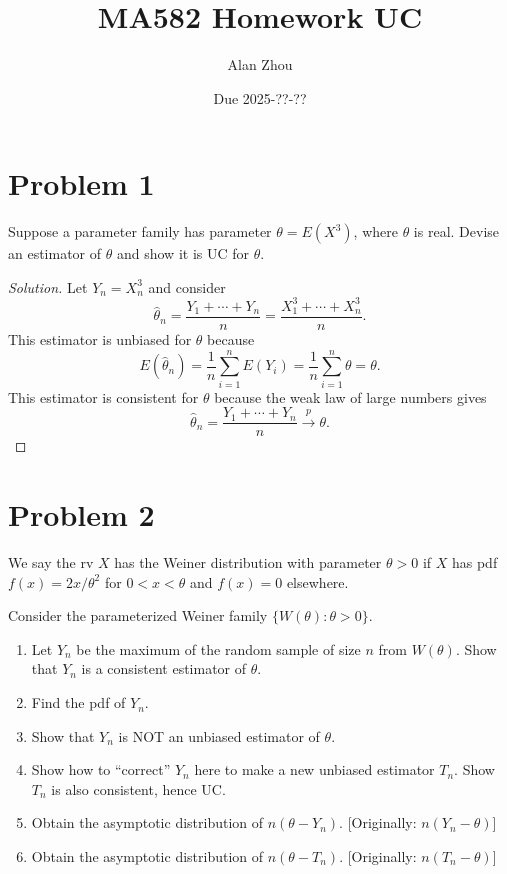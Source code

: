 \documentclass{article}
\title{MA582 Homework UC}
\author{Alan Zhou}
\date{Due 2025-??-??}
\begin{document}
\maketitle


\section{Problem 1}

Suppose a parameter family has parameter $\theta = E(X^3)$, where $\theta$ is real. Devise an estimator of $\theta$ and show it is UC for $\theta$.

\begin{proof}[Solution]
Let $Y_n = X_n^3$ and consider
\begin{equation*}
\hat{\theta}_n = \frac{Y_1 + \cdots + Y_n}{n} = \frac{X_1^3 + \cdots + X_n^3}{n}.
\end{equation*}
This estimator is unbiased for $\theta$ because
\begin{equation*}
E(\hat{\theta}_n) = \frac{1}{n}\sum_{i = 1}^n E(Y_i) = \frac{1}{n}\sum_{i = 1}^n \theta = \theta.
\end{equation*}
This estimator is consistent for $\theta$ because the weak law of large numbers gives
\begin{equation*}
\hat{\theta}_n = \frac{Y_1 + \cdots + Y_n}{n}\stackrel{p}{\longrightarrow}\theta.
\end{equation*}
\end{proof}



\section{Problem 2}

We say the rv $X$ has the Weiner distribution with parameter $\theta > 0$ if $X$ has pdf $f(x) = 2x/\theta^2$ for $0 < x < \theta$ and $f(x) = 0$ elsewhere.

Consider the parameterized Weiner family $\{W(\theta) : \theta > 0\}$.

\begin{enumerate}[label=(\alph*)]
\item Let $Y_n$ be the maximum of the random sample of size $n$ from $W(\theta)$. Show that $Y_n$ is a consistent estimator of $\theta$.
\item Find the pdf of $Y_n$.
\item Show that $Y_n$ is NOT an unbiased estimator of $\theta$.
\item Show how to ``correct'' $Y_n$ here to make a new unbiased estimator $T_n$. Show $T_n$ is also consistent, hence UC.
\item Obtain the asymptotic distribution of $n(\theta - Y_n)$. [Originally: $n(Y_n - \theta)$]
\item Obtain the asymptotic distribution of $n(\theta - T_n)$. [Originally: $n(T_n - \theta)$]
\end{enumerate}
\end{document}
